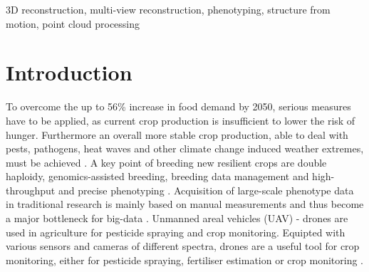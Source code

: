 \documentclass[conference,]{IEEEtran}
\begin{document}
\begin{IEEEkeywords}
3D reconstruction, multi-view reconstruction, phenotyping, structure
from motion, point cloud processing
\end{IEEEkeywords}




\maketitle


%
\IEEEpeerreviewmaketitle

\ifdefined\Shaded\renewenvironment{Shaded}{\begin{tcolorbox}[breakable, sharp corners, frame hidden, interior hidden, boxrule=0pt, enhanced, borderline west={3pt}{0pt}{shadecolor}]}{\end{tcolorbox}}\fi


\hypertarget{introduction}{%
\section{Introduction}\label{introduction}}

To overcome the up to 56\% increase in food demand by 2050, serious
measures have to be applied, as current crop production is insufficient
to lower the risk of hunger. Furthermore an overall more stable crop
production, able to deal with pests, pathogens, heat waves and other
climate change induced weather extremes, must be achieved
\autocite{vandijk2021}. A key point of breeding new resilient crops are
double haploidy, genomics-assisted breeding, breeding data management
and high-throughput and precise phenotyping
\autocite{prasanna2021,araus2018}. Acquisition of large-scale phenotype
data in traditional research is mainly based on manual measurements and
thus become a major bottleneck for big-data \autocite{yang2020}.
Unmanned areal vehicles (UAV) - drones are used in agriculture for
pesticide spraying and crop monitoring. Equipted with various sensors
and cameras of different spectra, drones are a useful tool for crop
monitoring, either for pesticide spraying, fertiliser estimation or crop
monitoring \autocite{mogili2018}.
\end{document}
